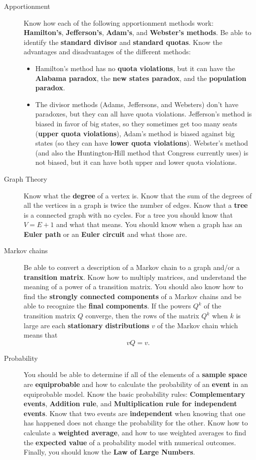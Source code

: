 \documentclass[11pt]{exam}
\begin{document}
\begin{description}
\item[Apportionment] Know how each of the following apportionment methods work: \textbf{Hamilton's}, \textbf{Jefferson's}, \textbf{Adam's}, and \textbf{Webster's methods}. Be able to identify the \textbf{standard divisor} and \textbf{standard quotas}.  Know the advantages and disadvantages of the different methods:

\begin{itemize}
\item Hamilton's method has no \textbf{quota violations}, but it can have the \textbf{Alabama paradox}, the \textbf{new states paradox}, and the \textbf{population paradox}. 

\item The divisor methods (Adams, Jeffersons, and Websters) don't have paradoxes, but they can all have quota violations.  Jefferson's method is biased in favor of big states, so they sometimes get too many seats (\textbf{upper quota violations}), Adam's method is biased against big states (so they can have \textbf{lower quota violations}).  Webster's method (and also the Huntington-Hill method that Congress currently uses) is not biased, but it can have both upper and lower quota violations.  
\end{itemize}

\item[Graph Theory] Know what the \textbf{degree} of a vertex is.  Know that the sum of the degrees of all the vertices in a graph is twice the number of edges.  Know that a \textbf{tree} is a connected graph with no cycles.  For a tree you should know that $V = E+1$ and what that means.  You should know when a graph has an \textbf{Euler path} or an \textbf{Euler circuit} and what those are.  

\item[Markov chains] Be able to convert a description of a Markov chain to a graph and/or a \textbf{transition matrix}.  Know how to multiply matrices, and understand the meaning of a power of a transition matrix.  You should also know how to find the \textbf{strongly connected components} of a Markov chains and be able to recognize the \textbf{final components}.  If the powers $Q^k$ of the transition matrix $Q$ converge, then the rows of the matrix $Q^k$ when $k$ is large are each \textbf{stationary distributions} $v$ of the Markov chain which means that 
$$v Q = v.$$

\item[Probability] You should be able to determine if all of the elements of a \textbf{sample space} are \textbf{equiprobable} and how to calculate the probability of an \textbf{event} in an equiprobable model. Know the basic probability rules: \textbf{Complementary events}, \textbf{Addition rule}, and \textbf{Multiplication rule for independent events}.  Know that two events are \textbf{independent} when knowing that one has happened does not change the probability for the other. Know how to calculate a \textbf{weighted average}, and how to use weighted averages to find the \textbf{expected value} of a probability model with numerical outcomes.  Finally, you should know the \textbf{Law of Large Numbers}.   

\end{description}
\end{document}
